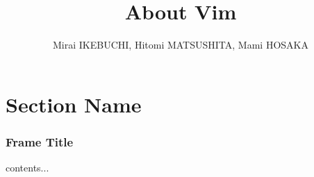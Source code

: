 \documentclass{beamer}
\title{About Vim}
\author{Mirai IKEBUCHI, Hitomi MATSUSHITA, Mami HOSAKA}
\date{}
\begin{document}
\frame{\titlepage}

\section{Section Name}

\begin{frame}
	\frametitle{Frame Title}
	contents...
\end{frame}
\end{document}
